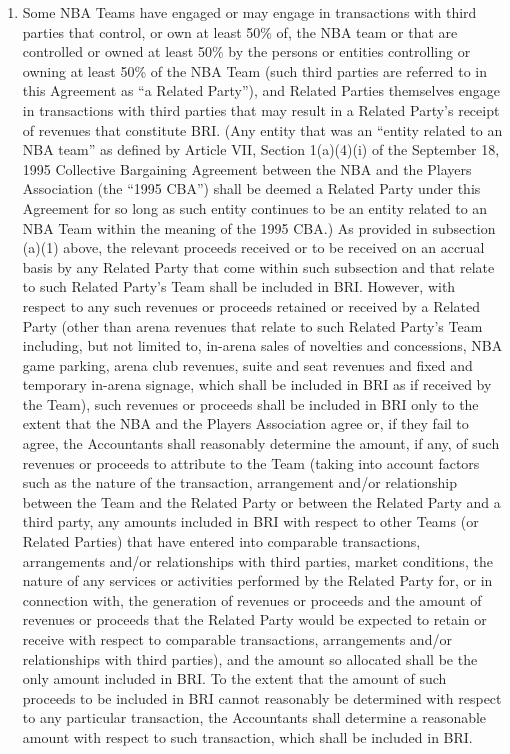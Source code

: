 \documentclass[
]{book}
\providecommand{\tightlist}{%
  \setlength{\itemsep}{0pt}\setlength{\parskip}{0pt}}
\begin{document}
\begin{enumerate}
\begin{enumerate}
    \begin{enumerate}
    \def\labelenumiii{(\roman{enumiii})}
    \tightlist
    \item
      Some NBA Teams have engaged or may engage in transactions with third parties that control, or own at least 50\% of, the NBA team or that are controlled or owned at least 50\% by the persons or entities controlling or owning at least 50\% of the NBA Team (such third parties are referred to in this Agreement as ``a Related Party''), and Related Parties themselves engage in transactions with third parties that may result in a Related Party's receipt of revenues that constitute BRI. (Any entity that was an ``entity related to an NBA team'' as defined by Article VII, Section 1(a)(4)(i) of the September 18, 1995 Collective Bargaining Agreement between the NBA and the Players Association (the ``1995 CBA'') shall be deemed a Related Party under this Agreement for so long as such entity continues to be an entity related to an NBA Team within the meaning of the 1995 CBA.) As provided in subsection (a)(1) above, the relevant proceeds received or to be received on an accrual basis by any Related Party that come within such subsection and that relate to such Related Party's Team shall be included in BRI. However, with respect to any such revenues or proceeds retained or received by a Related Party (other than arena revenues that relate to such Related Party's Team including, but not limited to, in-arena sales of novelties and concessions, NBA game parking, arena club revenues, suite and seat revenues and fixed and temporary in-arena signage, which shall be included in BRI as if received by the Team), such revenues or proceeds shall be included in BRI only to the extent that the NBA and the Players Association agree or, if they fail to agree, the Accountants shall reasonably determine the amount, if any, of such revenues or proceeds to attribute to the Team (taking into account factors such as the nature of the transaction, arrangement and/or relationship between the Team and the Related Party or between the Related Party and a third party, any amounts included in BRI with respect to other Teams (or Related Parties) that have entered into comparable transactions, arrangements and/or relationships with third parties, market conditions, the nature of any services or activities performed by the Related Party for, or in connection with, the generation of revenues or proceeds and the amount of revenues or proceeds that the Related Party would be expected to retain or receive with respect to comparable transactions, arrangements and/or relationships with third parties), and the amount so allocated shall be the only amount included in BRI. To the extent that the amount of such proceeds to be included in BRI cannot reasonably be determined with respect to any particular transaction, the Accountants shall determine a reasonable amount with respect to such transaction, which shall be included in BRI.

\end{enumerate}
\end{enumerate}
\end{enumerate}
\end{document}
